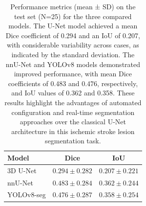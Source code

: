 \documentclass[12pt]{article}
\begin{document}

\begin{table}[tp]
\centering
\caption{Performance metrics (mean ± SD) on the test set (N=25) for the three compared models. The U-Net model achieved a mean Dice coefficient of 0.294 and an IoU of 0.207, with considerable variability across cases, as indicated by the standard deviation. The nnU-Net and YOLOv8 models demonstrated improved performance, with mean Dice coefficients of 0.483 and 0.476, respectively, and IoU values of 0.362 and 0.358. These results highlight the advantages of automated configuration and real-time segmentation approaches over the classical U-Net architecture in this ischemic stroke lesion segmentation task.}\label{tab:comparative_metrics}
\label{tab:comparative_metrics}
\begin{tabular}{lcc}
\toprule
Model & Dice & IoU \\
\midrule
3D U-Net       & $0.294 \pm 0.282$ & $0.207 \pm 0.221$ \\
nnU-Net        & $0.483 \pm 0.284$ & $0.362 \pm 0.244$ \\
YOLOv8-seg     & $0.476 \pm 0.287$ & $0.358 \pm 0.254$ \\
\bottomrule
\end{tabular}
\end{table}
\end{document}
